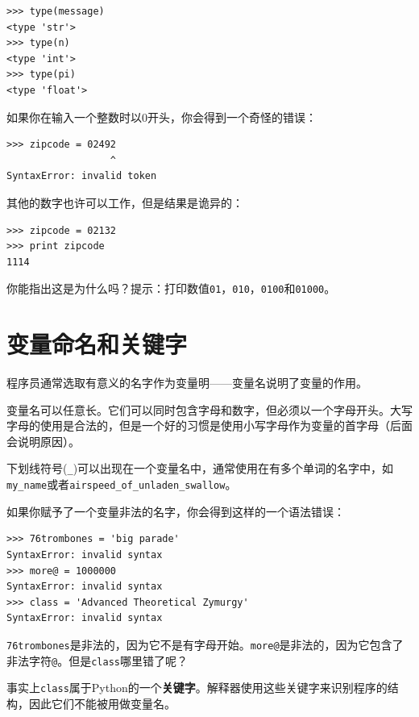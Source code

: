 \beforeverb
\begin{verbatim}
>>> type(message)
<type 'str'>
>>> type(n)
<type 'int'>
>>> type(pi)
<type 'float'>
\end{verbatim}
\afterverb
%
\begin{ex}
如果你在输入一个整数时以$0$开头，你会得到一个奇怪的错误：

\beforeverb
\begin{verbatim}
>>> zipcode = 02492
                  ^
SyntaxError: invalid token
\end{verbatim}
\afterverb

其他的数字也许可以工作，但是结果是诡异的：

\beforeverb
\begin{verbatim}
>>> zipcode = 02132
>>> print zipcode
1114
\end{verbatim}
\afterverb

你能指出这是为什么吗？提示：打印数值{\tt 01}，{\tt 010}，{\tt 0100}和{\tt 01000}。


\end{ex}

\section{变量命名和关键字}

程序员通常选取有意义的名字作为变量明——变量名说明了变量的作用。

变量名可以任意长。它们可以同时包含字母和数字，但必须以一个字母开头。大写字母的使用是合法的，但是一个好的习惯是使用小写字母作为变量的首字母（后面会说明原因）。

下划线符号(\verb"_")可以出现在一个变量名中，通常使用在有多个单词的名字中，如\verb"my_name"或者\verb"airspeed_of_unladen_swallow"。


如果你赋予了一个变量非法的名字，你会得到这样的一个语法错误：

\beforeverb
\begin{verbatim}
>>> 76trombones = 'big parade'
SyntaxError: invalid syntax
>>> more@ = 1000000
SyntaxError: invalid syntax
>>> class = 'Advanced Theoretical Zymurgy'
SyntaxError: invalid syntax
\end{verbatim}
\afterverb
%
{\tt 76trombones}是非法的，因为它不是有字母开始。{\tt more@}是非法的，因为它包含了非法字符{\tt @}。但是{\tt class}哪里错了呢？

事实上{\tt class}属于Python的一个{\bf 关键字}。解释器使用这些关键字来识别程序的结构，因此它们不能被用做变量名。

